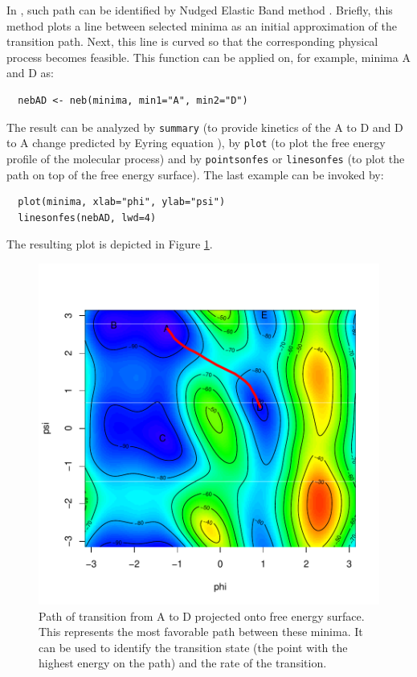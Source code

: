 In , such path can be identified by Nudged Elastic
Band method \citep{neb}. Briefly, this method plots a line between
selected minima as an initial approximation of the transition path.
Next, this line is curved so that the corresponding physical process
becomes feasible. This function can be applied on, for example, minima A
and D as:

\begin{verbatim}
  nebAD <- neb(minima, min1="A", min2="D")
\end{verbatim}

The result can be analyzed by \texttt{summary} (to provide kinetics of
the A to D and D to A change predicted by Eyring equation
\citep{eyring}), by \texttt{plot} (to plot the free energy profile of
the molecular process) and by \texttt{pointsonfes} or
\texttt{linesonfes} (to plot the path on top of the free energy
surface). The last example can be invoked by:

\begin{verbatim}
  plot(minima, xlab="phi", ylab="psi")
  linesonfes(nebAD, lwd=4)
\end{verbatim}

The resulting plot is depicted in Figure \ref{fig:neb}.

\begin{Schunk}
\begin{figure}

{\centering \includegraphics[width=0.8\linewidth]{metadynminer_files/figure-latex/neb-1} 

}

\caption[Path of transition from A to D projected onto free energy surface]{Path of transition from A to D projected onto free energy surface. This represents the most favorable path between these minima. It can be used to identify the transition state (the point with the highest energy on the path) and the rate of the transition.}\label{fig:neb}
\end{figure}
\end{Schunk}

